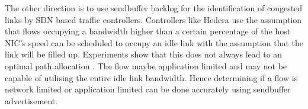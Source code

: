 \documentclass[a4paper,11pt]{article}
\begin{document}
The other direction is to use sendbuffer backlog for the identification
of congested links by SDN based traffic controllers. Controllers like
Hedera \cite{sdn} use the assumption that flows occupying a
bandwidth higher than
a certain percentage of the host NIC's speed can be scheduled to
occupy an idle link with the assumption that the link will be filled
up. Experiments show that this does not always lead to an optimal
path allocation \cite{ohflow}. The flow maybe application limited and may not
be capable of utilising the entire idle link bandwidth. Hence
determining if a flow is network limited or application limited
can be done accurately using sendbuffer advertisement.

\printbibliography
\end{document}
